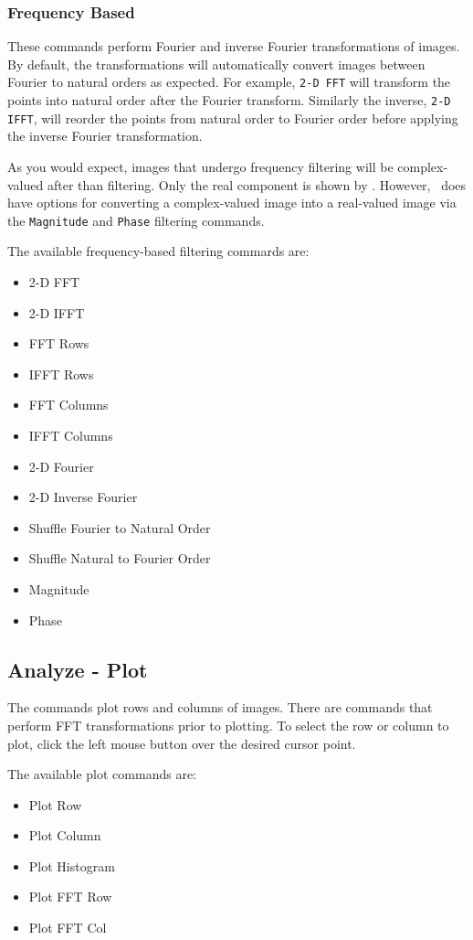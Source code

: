 \subsubsection{Frequency Based}
These commands perform Fourier and inverse Fourier transformations of
images. By default, the transformations will automatically convert
images between Fourier to natural orders as expected. For example, \texttt{2-D FFT}
will transform the points into natural order after the Fourier transform.
Similarly the inverse, \texttt{2-D IFFT}, will reorder the points from
natural order to Fourier order before applying the inverse Fourier transformation.

As you would expect, images that undergo frequency filtering will be complex-valued
after than filtering. Only the real component is shown by \ctsim. However, \ctsim\ does
have options for converting a complex-valued image into a real-valued image via
the \texttt{Magnitude} and \texttt{Phase} filtering commands.

The available frequency-based filtering commards are:

\begin{itemize}\itemsep=0pt
\item 2-D FFT
\item 2-D IFFT
\item FFT Rows
\item IFFT Rows
\item FFT Columns
\item IFFT Columns
\item 2-D Fourier
\item 2-D Inverse Fourier
\item Shuffle Fourier to Natural Order
\item Shuffle Natural to Fourier Order
\item Magnitude
\item Phase
\end{itemize}

\subsection{Analyze - Plot}
The commands plot rows and columns of images. There are commands
that perform FFT transformations prior to plotting. To select
the row or column to plot, click the left mouse button over the
desired cursor point.

The available plot commands are:
\begin{itemize}\itemsep=0pt
\item Plot Row
\item Plot Column
\item Plot Histogram
\item Plot FFT Row
\item Plot FFT Col
\end{itemize}

